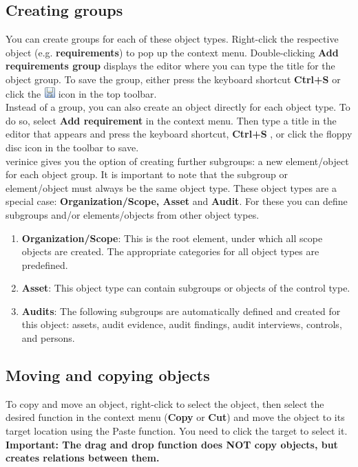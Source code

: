 \documentclass[a4paper,10pt]{book}
\begin{document}
\subsection{Creating groups}
You can create groups for each of these object types. Right-click the respective object (e.g. \textbf{requirements}) to pop up the context menu. Double-clicking \textbf{Add requirements group}
displays the editor where you can type the title for the object group. To save the group, either
press the keyboard shortcut \textbf{Ctrl+S} or click the \includegraphics[height=2ex]{Icon/Disk.png}
icon in the top toolbar.
\newline\\
Instead of a group, you can also create an object directly for each object type. To do so, select
\textbf{Add requirement} in the context menu. Then type a title in the editor that appears
and press the keyboard shortcut, \textbf{Ctrl+S} , or click the floppy disc icon in the toolbar to save.
\newline\\
verinice gives you the option of creating further subgroups: a new element/object for each object group.
It is important to note that the subgroup or element/object must always be the same object type.
These object types are a special case: \textbf{Organization/Scope, Asset} and \textbf{Audit}.
For these you can define subgroups and/or elements/objects from other object types.
\begin{enumerate}
\item \textbf{Organization/Scope}: This is the root element, under which all scope objects are created. The appropriate categories for all object types are predefined.
\item \textbf{Asset}: This object type can contain subgroups or objects of the control type.
\item \textbf{Audits}: The following subgroups are automatically defined and created for this object: assets, audit evidence, audit findings, audit interviews, controls, and persons.
\end{enumerate}

\subsection{Moving and copying objects}
To copy and move an object, right-click to select the object, then select the desired function in the context menu
(\textbf{Copy} or \textbf{Cut}) and move the object to its target location using the Paste function. You need to click the
target to select it.
\newline\\
\textbf{Important: The drag and drop function does NOT copy objects, but creates relations between them.}
\end{document}
